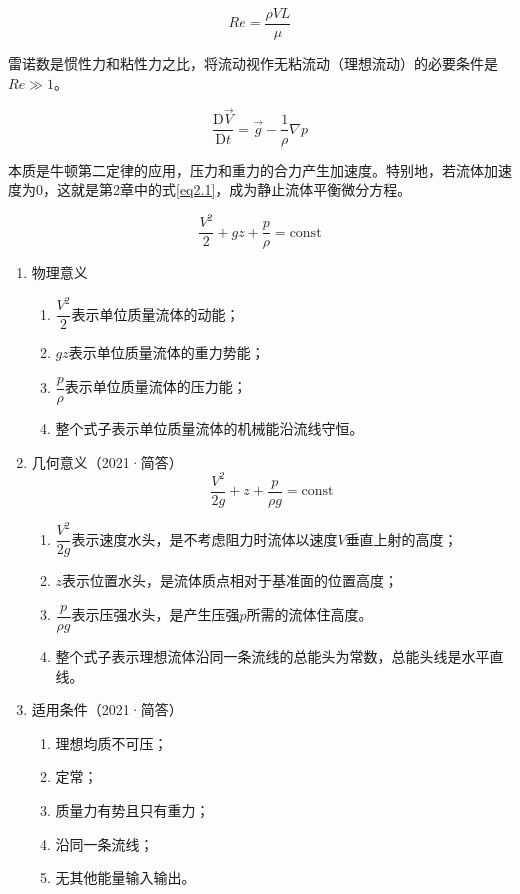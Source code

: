 

\begin{equation*}
	Re = \dfrac{\rho V L}{\mu}
\end{equation*}

雷诺数是惯性力和粘性力之比，将流动视作无粘流动（理想流动）的必要条件是$Re \gg 1$。


\begin{equation}
	\dfrac{\mathrm{D} \vec{V}}{\mathrm{D} t} = \vec{g} - \dfrac{1}{\rho} \nabla p \label{eq4.2}
\end{equation}

本质是牛顿第二定律的应用，压力和重力的合力产生加速度。特别地，若流体加速度为0，这就是第2章中的式\ref{eq2.1}，成为静止流体平衡微分方程。


\begin{equation}
	\dfrac{V^2}{2} + gz + \dfrac{p}{\rho} = \text{const}
\end{equation}

\begin{enumerate}
	\item 物理意义
	\begin{enumerate}
		\item $\dfrac{V^2}{2}$表示单位质量流体的动能；
		\vskip 0.1cm
		\item $gz$表示单位质量流体的重力势能；
		\vskip 0.1cm
		\item $\dfrac{p}{\rho}$表示单位质量流体的压力能；
		\vskip 0.1cm
		\item 整个式子表示单位质量流体的机械能沿流线守恒。
	\end{enumerate}
	\item 几何意义（2021·简答）
	\begin{equation}
		\dfrac{V^2}{2g} + z + \dfrac{p}{\rho g} = \text{const}
	\end{equation}
	\begin{enumerate}
		\item $\dfrac{V^2}{2g}$表示速度水头，是不考虑阻力时流体以速度$V$垂直上射的高度；
		\vskip 0.1cm
		\item $z$表示位置水头，是流体质点相对于基准面的位置高度；
		\vskip 0.1cm
		\item $\dfrac{p}{\rho g}$表示压强水头，是产生压强$p$所需的流体住高度。
		\vskip 0.1cm
		\item 整个式子表示理想流体沿同一条流线的总能头为常数，总能头线是水平直线。
	\end{enumerate}
    \item 适用条件（2021·简答）
    \begin{enumerate}
    	\item 理想均质不可压；
    	\item 定常；
    	\item 质量力有势且只有重力；
    	\item 沿同一条流线；
    	\item 无其他能量输入输出。
    \end{enumerate}
\end{enumerate}

